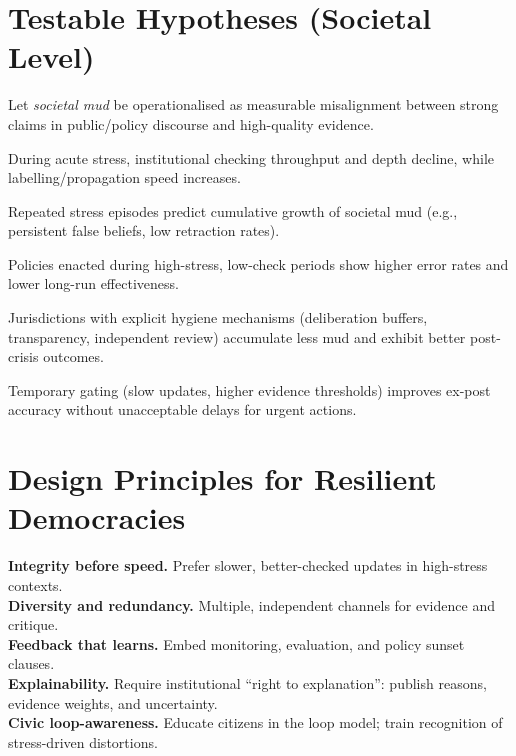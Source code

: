 \documentclass[11pt,a4paper]{article}
\begin{document}
\section{Testable Hypotheses (Societal Level)}
Let \emph{societal mud} be operationalised as measurable misalignment between strong claims in public/policy discourse and high-quality evidence.
\begin{description}[style=nextline]
  \item[H1 (Stress--Checking).] During acute stress, institutional checking throughput and depth decline, while labelling/propagation speed increases.
  \item[H2 (Mud Accumulation).] Repeated stress episodes predict cumulative growth of societal mud (e.g., persistent false beliefs, low retraction rates).
  \item[H3 (Decision Degradation).] Policies enacted during high-stress, low-check periods show higher error rates and lower long-run effectiveness.
  \item[H4 (Meta-Model Protection).] Jurisdictions with explicit hygiene mechanisms (deliberation buffers, transparency, independent review) accumulate less mud and exhibit better post-crisis outcomes.
  \item[H5 (Gating Efficacy).] Temporary gating (slow updates, higher evidence thresholds) improves ex-post accuracy without unacceptable delays for urgent actions.
\end{description}

\section{Design Principles for Resilient Democracies}
\textbf{Integrity before speed.} Prefer slower, better-checked updates in high-stress contexts.\\
\textbf{Diversity and redundancy.} Multiple, independent channels for evidence and critique.\\
\textbf{Feedback that learns.} Embed monitoring, evaluation, and policy sunset clauses.\\
\textbf{Explainability.} Require institutional ``right to explanation'': publish reasons, evidence weights, and uncertainty.\\
\textbf{Civic loop-awareness.} Educate citizens in the loop model; train recognition of stress-driven distortions.
\end{document}
